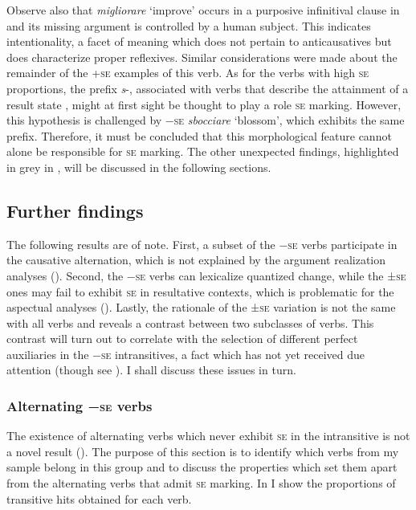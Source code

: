 \documentclass[output=paper,colorlinks,citecolor=brown
]{langscibook}
\begin{document}
Observe also that \textit{migliorare} ‘improve’ occurs in a purposive infinitival clause in  and its missing argument is controlled by a human subject. This indicates intentionality, a facet of meaning which does not pertain to anticausatives but does characterize proper reflexives. Similar considerations were made about the remainder of the +\textsc{se} examples of this verb. 
As for the verbs with high \textsc{se} proportions, the prefix \textit{s}-, associated with verbs that describe the attainment of a result state \citep[112, 146, 159]{iacobini2004prefissazione}, might at first sight be thought to play a role \textsc{se} marking. However, this hypothesis is challenged by −\textsc{se} \textit{sbocciare} ‘blossom’, which exhibits the same prefix. Therefore, it must be concluded that this morphological feature cannot alone be responsible for \textsc{se} marking. The other unexpected findings, highlighted in grey in , will be discussed in the following sections.  

\subsection{Further findings}
\label{bentley_section_3.3}
The following results are of note. First, a subset of the −\textsc{se} verbs participate in the causative alternation, which is not explained by the argument realization analyses (). Second, the −\textsc{se} verbs can lexicalize quantized change, while the ±\textsc{se} ones may fail to exhibit \textsc{se} in resultative contexts, which is problematic for the aspectual analyses (). Lastly, the rationale of the ±\textsc{se} variation is not the same with all verbs and reveals a contrast between two subclasses of verbs. 
This contrast will turn out to correlate with the selection of different perfect auxiliaries in the −\textsc{se} intransitives, a fact which has not yet received due attention (though see \cite{bentley2021two}). I shall discuss these issues in turn.\largerpage[-1]\pagebreak

\subsubsection{Alternating −\textsc{se} verbs}
\label{bentley_section_3.3.1}
The existence of alternating verbs which never exhibit \textsc{se} in the intransitive is not a novel result (). The purpose of this section is to identify which verbs from my sample belong in this group and to discuss the properties which set them apart from the alternating verbs that admit \textsc{se} marking. In  I show the proportions of transitive hits obtained for each verb.
\end{document}
